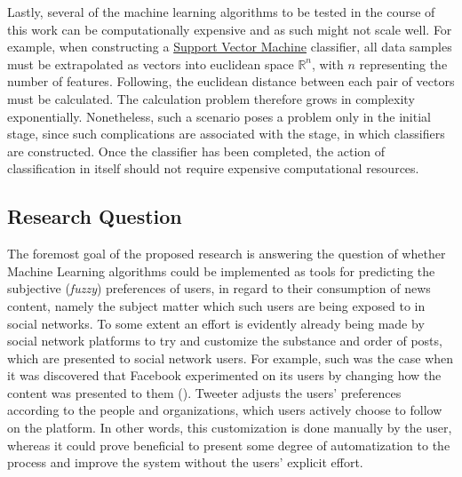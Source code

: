 		\par 
		
		Lastly, several of the machine learning algorithms to be tested in the course of this work can be computationally expensive and as such might not scale well. For example, when constructing a \hyperref[svm]{Support Vector Machine} classifier, all data samples must be extrapolated as vectors into euclidean space $ \mathbb{R}^n $, with $ n $ representing the number of features. Following, the euclidean distance between each pair of vectors must be calculated. The calculation problem therefore grows in complexity exponentially. Nonetheless, such a scenario poses a problem only in the initial stage, since such complications are associated with the stage, in which classifiers are constructed. Once the classifier has been completed, the action of classification in itself should not require expensive computational resources.
		
	\subsection{Research Question}
		The foremost goal of the proposed research is answering the question of whether Machine Learning algorithms could be implemented as tools for predicting the subjective (\textit{fuzzy}) preferences of users, in regard to their consumption of news content, namely the subject matter which such users are being exposed to in social networks. To some extent an effort is evidently already being made by social network platforms to try and customize the substance and order of posts, which are presented to social network users. For example, such was the case when it was discovered that Facebook experimented on its users by changing how the content was presented to them (\cite{facebook_experiment}). Tweeter adjusts the users' preferences according to the people and organizations, which users actively choose to follow on the platform. In other words, this customization is done manually by the user, whereas it could prove beneficial to present some degree of automatization to the process and improve the system without the users' explicit effort.
	